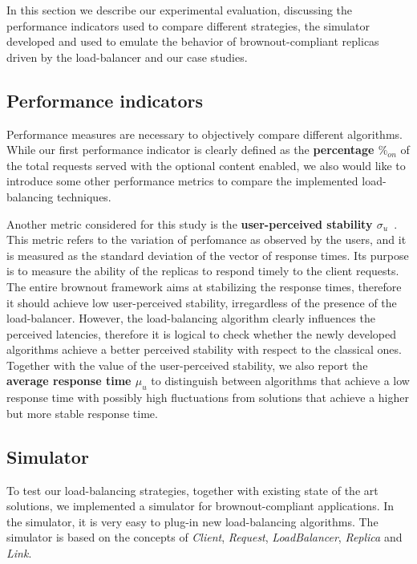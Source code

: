 In this section we describe our experimental evaluation, discussing
the performance indicators used to compare different strategies, the
simulator developed and used to emulate the behavior of
brownout-compliant replicas driven by the load-balancer and our case
studies.

\subsection{Performance indicators}

Performance measures are necessary to objectively compare different
algorithms. While our first performance indicator is clearly defined
as the \textbf{percentage $\%_{on}$} of the total requests served with
the optional content enabled, we also would like to introduce some
other performance metrics to compare the implemented load-balancing
techniques.

Another metric considered for this study is the \textbf{user-perceived
  stability $\sigma_u$}~\cite{GeograficalSASO}. This metric refers to
the variation of perfomance as observed by the users, and it is
measured as the standard deviation of the vector of response
times. Its purpose is to measure the ability of the replicas to
respond timely to the client requests. The entire brownout framework
aims at stabilizing the response times, therefore it should achieve
low user-perceived stability, irregardless of the presence of the
load-balancer. However, the load-balancing algorithm clearly
influences the perceived latencies, therefore it is logical to check
whether the newly developed algorithms achieve a better perceived
stability with respect to the classical ones. Together with the value
of the user-perceived stability, we also report the \textbf{average
  response time $\mu_u$} to distinguish between algorithms that
achieve a low response time with possibly high fluctuations from
solutions that achieve a higher but more stable response time.

\subsection{Simulator}

To test our load-balancing strategies, together with existing state 
of the art solutions, we implemented a simulator for brownout-compliant 
applications. In the simulator, it is very easy to plug-in new 
load-balancing algorithms. The simulator is based on the concepts of 
\emph{Client},  \emph{Request}, \emph{LoadBalancer}, \emph{Replica} 
and \emph{Link}.

